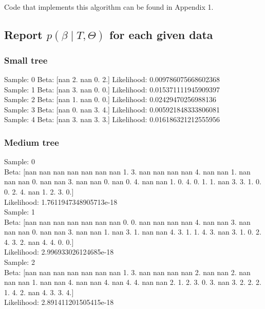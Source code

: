\documentclass[11pt,a4paper]{article}
\begin{document}
Code that implements this algorithm can be found in Appendix 1.

\subsection{Report $p(\beta \mid T, \Theta)$ for each given data}

\subsubsection{Small tree}

	Sample:  0 	Beta:  [nan  2. nan  0.  2.]
	Likelihood:  0.009786075668602368\\

	Sample:  1 	Beta:  [nan  3. nan  0.  0.]
	Likelihood:  0.015371111945909397\\

	Sample:  2 	Beta:  [nan  1. nan  0.  0.]
	Likelihood:  0.02429470256988136\\

	Sample:  3 	Beta:  [nan  0. nan  3.  4.]
	Likelihood:  0.005921848333806081\\

	Sample:  4 	Beta:  [nan  3. nan  3.  3.]
	Likelihood:  0.016186321212555956\\

\subsubsection{Medium tree}

	Sample:  0 \\	Beta:  [nan nan nan nan nan nan nan  1.  3. nan nan nan nan  4. nan nan  1. nan
 nan nan  0. nan nan  3. nan nan  0. nan  0.  4. nan nan  1.  0.  4.  0.
  1.  1. nan  3.  3.  1.  0.  0.  2.  4. nan  1.  2.  3.  0.]\\
	Likelihood:  1.7611947348905713e-18\\

	Sample:  1 \\	Beta:  [nan nan nan nan nan nan nan  0.  0. nan nan nan nan  4. nan nan  3. nan
 nan nan  0. nan nan  3. nan nan  1. nan  3.  1. nan nan  4.  3.  1.  1.
  4.  3. nan  3.  1.  0.  2.  4.  3.  2. nan  4.  4.  0.  0.]\\
	Likelihood:  2.996933026124685e-18\\

	Sample:  2 \\	Beta:  [nan nan nan nan nan nan nan  1.  3. nan nan nan nan  2. nan nan  2. nan
 nan nan  1. nan nan  4. nan nan  4. nan  4.  4. nan nan  2.  1.  2.  3.
  0.  3. nan  3.  2.  2.  2.  1.  4.  2. nan  4.  3.  3.  4.]\\
	Likelihood:  2.891411201505415e-18\\
\end{document}
